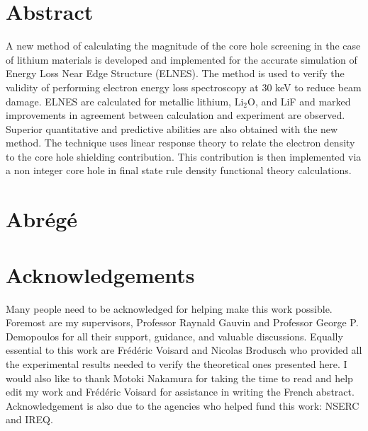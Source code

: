 \documentclass[12pt]{report}
\begin{document}



\renewcommand{\thepage}{\roman{page}}%
 
\tableofcontents





\chapter*{Abstract}



A new method of calculating the magnitude of the core hole screening in the case of lithium materials is developed and implemented for the accurate simulation of Energy Loss Near Edge Structure (ELNES).  The method is used to verify the validity of performing electron energy loss spectroscopy at 30 keV to reduce beam damage.  ELNES are calculated for metallic lithium, $\mathrm{Li_2O}$, and LiF and marked improvements in agreement between calculation and experiment are observed. Superior quantitative and predictive abilities are also obtained with the new method.   The technique uses linear response theory to relate the electron density to the core hole shielding contribution.  This contribution is then implemented via a non integer core hole in final state rule density functional theory calculations.
\\

\chapter*{Abr\'eg\'e}




\chapter*{Acknowledgements}
Many people need to be acknowledged for helping make this work possible.  Foremost are my supervisors,  Professor Raynald Gauvin and  Professor George P. Demopoulos for all their support, guidance, and valuable discussions.  Equally essential to this work are Fr\'ed\'eric Voisard and Nicolas Brodusch who provided all the experimental results needed to verify the theoretical ones presented here. I would also like to thank Motoki Nakamura  for taking the time to read and help edit my work and Fr\'ed\'eric Voisard for assistance in writing the French abstract. Acknowledgement is also due to the agencies who helped fund this work: NSERC and IREQ.  \\
\end{document}
